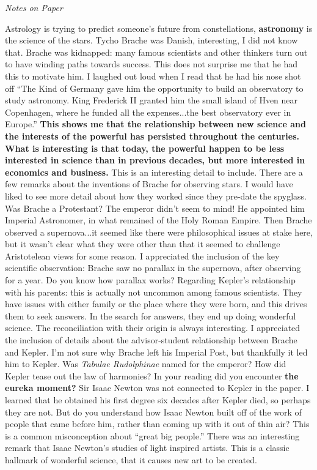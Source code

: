 \documentclass[10pt]{article}
\begin{document}
\textit{Notes on Paper}
\begin{outline}[enumerate]
\1 Astrology is trying to predict someone's future from constellations, \textbf{astronomy} is the science of the stars.
\1 Tycho Brache was Danish, interesting, I did not know that.
\1 Brache was kidnapped: many famous scientists and other thinkers turn out to have winding paths towards success.  This does not surprise me that he had this to motivate him.
\1 I laughed out loud when I read that he had his nose shot off
\1 ``The Kind of Germany gave him the opportunity to build an observatory to study astronomy.  King Frederick II granted him the small island of Hven near Copenhagen, where he funded all the expenses...the best observatory ever in Europe.''  \textbf{This shows me that the relationship between new science and the interests of the powerful has persisted throughout the centuries.  What is interesting is that today, the powerful happen to be less interested in science than in previous decades, but more interested in economics and business.}  This is an interesting detail to include.
\2 There are a few remarks about the inventions of Brache for observing stars.  I would have liked to see more detail about how they worked since they pre-date the spyglass.
\2 Was Brache a Protestant?  The emperor didn't seem to mind!  He appointed him Imperial Astronomer, in what remained of the Holy Roman Empire.
\2 Then Brache observed a supernova...it seemed like there were philosophical issues at stake here, but it wasn't clear what they were other than that it seemed to challenge Aristotelean views for some reason.  I appreciated the inclusion of the key scientific observation: Brache saw no parallax in the supernova, after observing for a year.  Do you know how parallax works?
\1 Regarding Kepler's relationship with his parents: this is actually not uncommon among famous scientists.  They have issues with either family or the place where they were born, and this drives them to seek answers.  In the search for answers, they end up doing wonderful science.  The reconciliation with their origin is always interesting.
\2 I appreciated the inclusion of details about the advisor-student relationship between Brache and Kepler.  I'm not sure why Brache left his Imperial Post, but thankfully it led him to Kepler.
\1 Was \textit{Tabulae Rudolphinae} named for the emperor?
\1 How did Kepler tease out the law of harmonies?  In your reading did you encounter \textbf{the eureka moment?}
\1 Sir Isaac Newton was not connected to Kepler in the paper.  I learned that he obtained his first degree six decades after Kepler died, so perhaps they are not.
\2 But do you understand how Isaac Newton built off of the work of people that came before him, rather than coming up with it out of thin air?  This is a common misconception about ``great big people.''
\2 There was an interesting remark that Isaac Newton's studies of light inspired artists.  This is a classic hallmark of wonderful science, that it causes new art to be created.
\end{outline}
\end{document}

